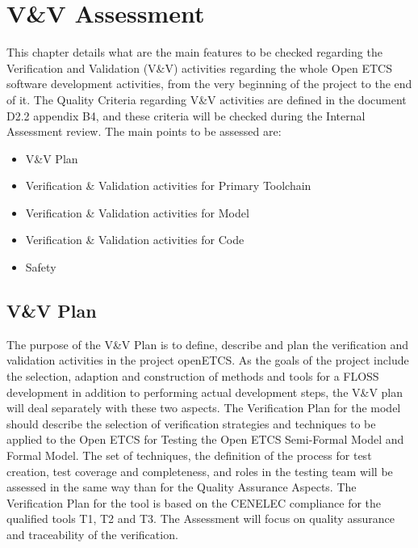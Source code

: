 \documentclass{template/openetcs_article}
\begin{document}
\section{V\&V Assessment}
This chapter details what are the main features to be checked regarding the Verification and Validation (V\&V)  activities regarding the whole Open ETCS software development activities, from the very beginning of the project to the end of it.
The Quality Criteria regarding V\&V activities are defined in the document D2.2 appendix B4, and these criteria will be checked during the Internal Assessment review. The main points to be assessed are:
\begin{itemize}
\item V\&V Plan
\item Verification \& Validation activities for Primary Toolchain
\item Verification \& Validation activities for Model
\item Verification \& Validation activities for Code
\item Safety
\end{itemize}

\subsection{V\&V Plan}
The purpose of the V\&V Plan is to define, describe and plan the verification and validation activities in the project openETCS. As the goals of the project include the selection, adaption and construction of methods and tools for a FLOSS development in addition to performing actual development steps, the V\&V plan will deal separately with these two aspects.
The Verification Plan for the model should describe the selection of verification strategies and techniques to be applied to the Open ETCS for Testing the Open ETCS Semi-Formal Model and Formal Model. The set of techniques, the definition of the process for test creation, test coverage and completeness, and roles in the testing team will be assessed in the same way than for the Quality Assurance Aspects.
The Verification Plan for the tool is based on the CENELEC compliance for the qualified tools T1, T2 and T3. The Assessment will focus on quality assurance and traceability of the verification.
\end{document}
